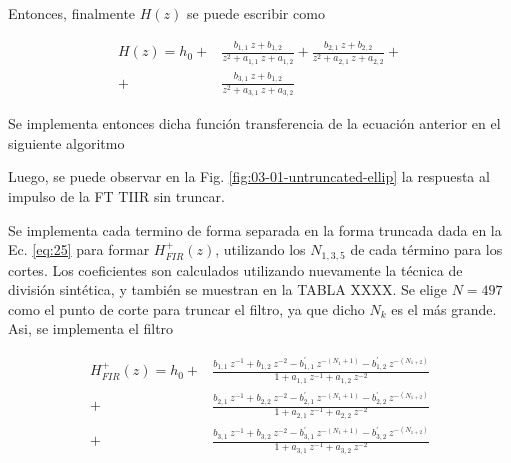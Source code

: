      Entonces, finalmente $H(z)$ se puede escribir como

     \begin{equation}
       \begin{aligned}
       H(z) = h_{0} +& \frac{b_{1,1} \: z + b_{1,2}}{z^{2} + a_{1,1} \: z + a_{1,2}} +
       \frac{b_{2,1} \: z + b_{2,2}}{z^{2} + a_{2,1} \: z + a_{2,2}} + \\
       +& \frac{b_{3,1} \: z + b_{1,2}}{z^{2} + a_{3,1} \: z + a_{3,2}}
       \label{eq:03-01-H}
       \end{aligned}
     \end{equation}

     Se implementa entonces dicha función transferencia de la ecuación anterior
     en el siguiente algoritmo

    


     Luego, se puede observar en la Fig. \ref{fig:03-01-untruncated-ellip} la
     respuesta al impulso de la FT TIIR sin truncar.

     Se implementa cada termino de forma separada en la forma truncada dada en la
     Ec. \ref{eq:25} para formar $H_{FIR}^{+}(z)$, utilizando los $N_{1,3,5}$ de
     cada término para los cortes. Los coeficientes son calculados utilizando
     nuevamente la técnica de división sintética, y también se muestran en la
     TABLA XXXX. Se elige $N = 497$ como el punto de corte para truncar el
     filtro, ya que dicho $N_{k}$ es el más grande. Asi, se implementa el filtro


     \begin{widetext}
     \begin{equation}
      \begin{aligned}
        H_{FIR}^{+}(z) = h_{0} +&
        \frac{b_{1,1} \: z^{-1} + b_{1,2} \: z^{-2} - b_{1,1}^{\prime} \: z^{-(N_{1}+1)} - b_{1,2}^{\prime} \: z^{-(N_{1+2})}}{1 + a_{1,1} \: z^{-1} + a_{1,2} \: z^{-2}} \\
        +& \frac{b_{2,1} \: z^{-1} + b_{2,2} \: z^{-2} - b_{2,1}^{\prime} \: z^{-(N_{1}+1)} - b_{2,2}^{\prime} \: z^{-(N_{1+2})}}{1 + a_{2,1} \: z^{-1} + a_{2,2} \: z^{-2}} \\
        +& \frac{b_{3,1} \: z^{-1} + b_{3,2} \: z^{-2} - b_{3,1}^{\prime} \: z^{-(N_{1}+1)} - b_{3,2}^{\prime} \: z^{-(N_{1+2})}}{1 + a_{3,1} \: z^{-1} + a_{3,2} \: z^{-2}}
      \end{aligned}
     \end{equation}
     \end{widetext}

